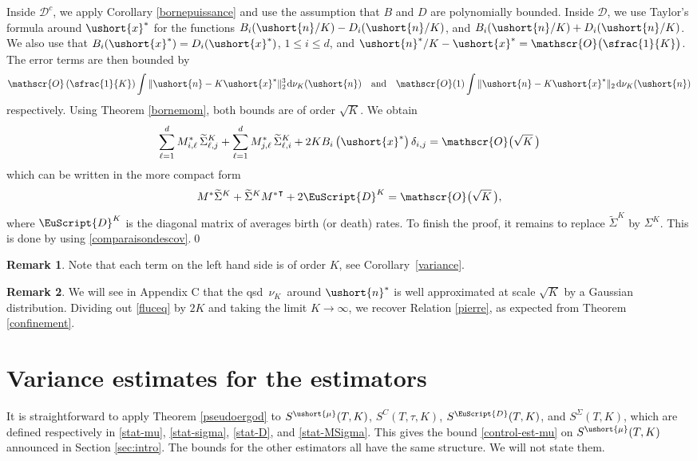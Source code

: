 \documentclass[JEP,XML,SOM,Unicode]{cedram}
\newcommand{\scaleto}[2]{#1}
\let\mathcal\mathscr
\numberwithin{equation}{section}
\theoremstyle{plain}
\theoremstyle{definition}
\newtheorem{remark}{Remark}[section]
\newcommand{\Oun}{\mathcal{O}(1)}
\newcommand{\sK}{K}
\newcommand{\vecn}{\ushort{n}}
\newcommand{\vecnf}{\ushort{n}^*}
\newcommand{\vecxf}{\ushort{x}^*}
\newcommand{\vmu}{\ushort{\mu}}
\newcommand{\nuk}{\nu_{K}}\let\snuk\nuk
\newcommand{\dd}{\hspace{1pt}\mathrm{d}}
\begin{document}
Inside $\mathcal{D}^c$, we apply Corollary \ref{bornepuissance} and use the assumption that $B$ and $D$ are polynomially
bounded. Inside $\mathcal{D}$, we use Taylor's formula around $\vecxf$ for the functions $B_i(\vecn/K)-D_i(\vecn/K)$, and
$B_i(\vecn/K)+D_i(\vecn/K)$. We also use that $B_{i}(\vecxf)=D_{i}(\vecxf)$, $1\le i\le d$, and $\vecnf/K-\vecxf=
\mathcal{O}\bigl(\sfrac{1}{K}\bigr)$. The error terms are then bounded by
\[
\mathcal{O}\left(\sfrac{1}{K}\right)\int \|\vecn-K\vecxf\|_{2}^{\scaleto{3}{4pt}} \dd \nuk(\vecn)\quad\text{and}\quad
\Oun \int \|\vecn-K\vecxf\|_{2} \dd \nuk(\vecn)
\]
respectively. Using Theorem \ref{bornemom}, both bounds are of order $\sqrt{K}$.
We obtain
\[
\sum_{\ell=1}^{d}M_{i,\ell}^{*}\,\widetilde{\Sigma}^{\sK}_{\ell,j}+
\sum_{\ell=1}^{d}M_{j,\ell}^*\,\widetilde{\Sigma}^{\sK}_{\ell,i}+2K B_{i}\left(\vecxf\right)\delta_{i,j}
=\mathcal{O}\bigl(\sqrt K\,\bigr)
\]
which can be written in the more compact form
\begin{equation}\label{fluceq}
M^* \widetilde{\Sigma}^{\sK}+\widetilde{\Sigma}^{\sK} {M^*}^{\intercal}+2\EuScript{D}^{\sK}=\mathcal{O}\bigl(\sqrt K\,\bigr),
\end{equation}
where $\EuScript{D}^{\sK}$ is the diagonal matrix of averages birth (or death) rates. To finish the proof, it remains to
replace $\widetilde\Sigma^{\sK}$ by $\Sigma^{\sK}$. This is done by using \eqref{comparaisondescov}.\qed

\begin{remark}
Note that each term on the left hand side is of order $K$, see Corollary~\ref{variance}.
\end{remark}
\begin{remark} We will see in Appendix C that the qsd $\,\nu_{K}\,$ around $\vecnf$ is well approximated at scale $\sqrt{K}$ by a Gaussian distribution.
Dividing out \eqref{fluceq} by $2K$ and taking the limit $K\to\infty$, we recover Relation \eqref{pierre}, as expected from Theorem \ref{confinement}.
\end{remark}

\section{Variance estimates for the estimators}
\label{sec:stat}

It is straightforward to apply Theorem \ref{pseudoergod} to $S^{\vmu}(T,K)$,
$S^{C}(T,\tau,K)$, $S^{{ \EuScript{D}}}(T,K)$, and
$S^{{ \Sigma}}(T,K)$, which are defined respectively in \eqref{stat-mu}, \eqref{stat-sigma}, \eqref{stat-D},
and \eqref{stat-MSigma}. This gives the bound \eqref{control-est-mu} on $S^{\vmu}(T,K)$ announced in
Section \ref{sec:intro}. The bounds for the other estimators all have the same structure. We will not state them.
\end{document}
